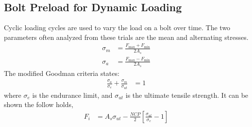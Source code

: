\subsection{Bolt Preload for Dynamic Loading}
Cyclic loading cycles are used to vary the load on a bolt over time. The two parameters often analyzed from these trials are the mean and alternating stresses.
\begin{align}
    \sigma_m &= \frac{F_{\text{max}} + F_{\text{min}}}{2A_s} \label{eq:mean_stress} \\
    \sigma_a &= \frac{F_{\text{max}} - F_{\text{min}}}{2A_s} \label{eq:alternating_stress}
\end{align}
The modified Goodman criteria states:
\begin{align*}
    \frac{\sigma_a}{\sigma_e} + \frac{\sigma_m}{\sigma_{ut}} &= 1
\end{align*}
where $\sigma_e$ is the endurance limit, and $\sigma_{ut}$ is the ultimate tensile strength. It can be shown the follow holds,
\begin{align*}
    F_i &= A_s \sigma_{ut} - \frac{NCP}{2} \left[\frac{\sigma_{ut}}{\sigma_e} - 1\right]
\end{align*}